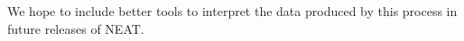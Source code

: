 \documentclass[11pt,a4paper]{article}
\begin{document}
We hope to include better tools to interpret the data produced by this process in future releases of {\sc NEAT}.



%
%
%
%
%
%
\end{document}
